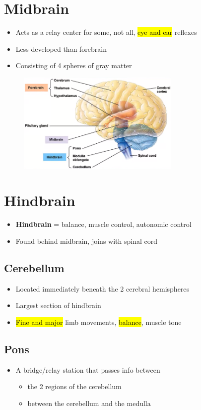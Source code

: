 \documentclass[a4paper,12pt]{article}
\begin{document}
\section{Midbrain}
\begin{itemize}
    \item{Acts as a relay center for some, not all, \hl{eye and ear} reflexes}
    \item{Less developed than forebrain}
    \item{Consisting of 4 spheres of gray matter}
\end{itemize}

\begin{figure}[H]
    \centering
    \includegraphics[width=0.7\textwidth]{brains}
\end{figure}

\section{Hindbrain}
\begin{itemize}
    \item{\textbf{Hindbrain} = balance, muscle control, autonomic control}
    \item{Found behind midbrain, joins with spinal cord}
\end{itemize}

\subsection{Cerebellum}
\begin{itemize}
    \item{Located immediately beneath the 2 cerebral hemispheres}
    \item{Largest section of hindbrain}
    \item{\hl{Fine and major} limb movements, \hl{balance}, muscle tone}
\end{itemize}

\subsection{Pons}
\begin{itemize}
    \item{
            A bridge/relay station that passes info between
            \begin{itemize}
                \item{the 2 regions of the cerebellum}
                \item{between the cerebellum and the medulla}
            \end{itemize}
        }
\end{itemize}
\end{document}
